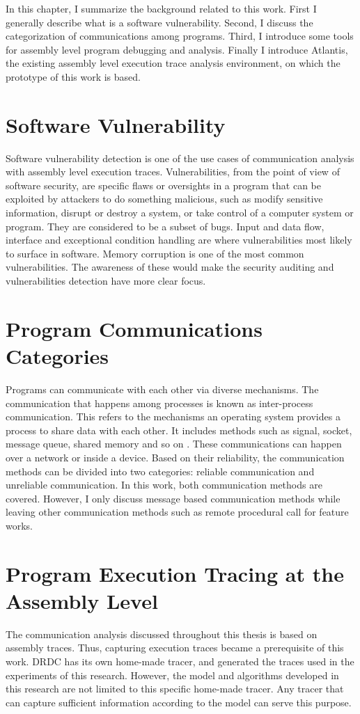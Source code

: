 \label{chapter:Bac}
In this chapter, I summarize the background related to this work. First I generally describe what is a software vulnerability. Second, I discuss the categorization of communications among programs. Third, I introduce some tools for assembly level program debugging and analysis. Finally I introduce Atlantis, the existing assembly level execution trace analysis environment, on which the prototype of this work is based.

\section{Software Vulnerability}
Software vulnerability detection is one of the use cases of communication analysis with assembly level execution traces. Vulnerabilities, from the point of view of software security, are specific flaws or oversights in a program that can be exploited by attackers to do something malicious, such as modify sensitive information, disrupt or destroy a system, or take control of a computer system or program\cite{dowd_art_2006}. They are considered to be a subset of bugs. Input and data flow, interface and exceptional condition handling are where vulnerabilities most likely to surface in software. Memory corruption is one of the most common vulnerabilities. The awareness of these would make the security auditing and vulnerabilities detection have more clear focus. 

\section{Program Communications Categories}
Programs can communicate with each other via diverse mechanisms. The communication that happens among processes is known as inter-process communication. This refers to the mechanisms an operating system provides a process to share data with each other. It includes methods such as signal, socket, message queue, shared memory and so on \cite{garrido2000inter}. These communications can happen over a network or inside a device. Based on their reliability, the communication methods can be divided into two categories: reliable communication and unreliable communication. In this work, both communication methods are covered. However, I only discuss message based communication methods while leaving other communication methods such as remote procedural call for feature works.

\section{Program Execution Tracing at the Assembly Level}
The communication analysis discussed throughout this thesis is based on assembly traces. Thus, capturing execution traces became a prerequisite of this work. DRDC has its own home-made tracer, and generated the traces used in the experiments of this research. However, the model and algorithms developed in this research are not limited to this specific home-made tracer. Any tracer that can capture sufficient information according to the model can serve this purpose.

